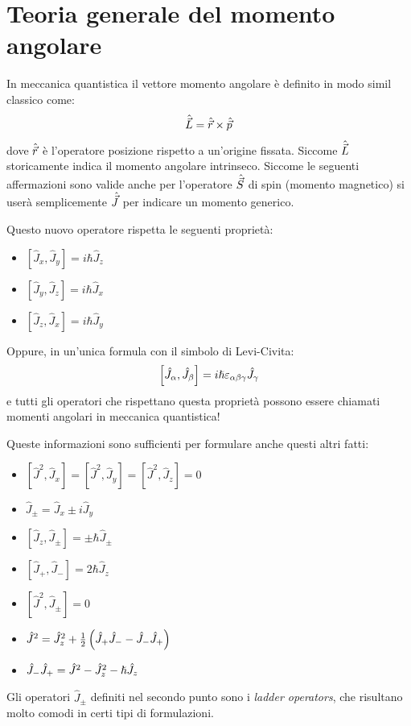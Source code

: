 \section{Teoria generale del momento angolare}
In meccanica quantistica il vettore momento angolare è definito in modo simil classico come:
\[
	\hat{\vec L} = \hat{\vec{r}} \times \hat{\vec{p}}
\]
dove $\hat{\vec{r}}$ è l'operatore posizione rispetto a un'origine fissata. Siccome $\hat{\vec{L}}$ storicamente indica il momento angolare intrinseco. Siccome le seguenti affermazioni sono valide anche per l'operatore $\hat{\vec{S}}$ di spin (momento magnetico) si userà semplicemente $\hat{\vec{J}}$ per indicare un momento generico.
\tab

Questo nuovo operatore rispetta le seguenti proprietà:
\begin{itemize}
	\item $[\hat{J}_x, \hat{J}_y] = i\hbar \hat{J}_z$
	\item $[\hat{J}_y, \hat{J}_z] = i\hbar \hat{J}_x$
	\item $[\hat{J}_z, \hat{J}_x] = i\hbar \hat{J}_y$
\end{itemize}
Oppure, in un'unica formula con il simbolo di Levi-Civita:
\[
	\left[\hat J_\alpha, \hat J_\beta\right] = i\hslash\varepsilon_{\alpha\beta\gamma}\hat J_\gamma
\]
e tutti gli operatori che rispettano questa proprietà possono essere chiamati momenti angolari in meccanica quantistica!

Queste informazioni sono sufficienti per formulare anche questi altri fatti:
\begin{itemize}
	\item $[\hat{J}^2, \hat{J}_x] = [\hat{J}^2, \hat{J}_y] = [\hat{J}^2, \hat{J}_z] = 0$
	\item $\hat{J}_{\pm} = \hat{J}_x \pm i\hat{J}_y$
	\item $[\hat{J}_z, \hat{J}_{\pm}] = \pm\hbar \hat{J}_{\pm}$
	\item $[\hat{J}_+, \hat{J}_-] = 2\hbar \hat{J}_z$
	\item $[\hat{J}^2, \hat{J}_{\pm}] = 0$
	\item $\hat J^2 = \hat J_z^2 + \frac{1}{2} \left( \hat J_+ \hat J_- - \hat J_-\hat J_+ \right)$
	\item $\hat J_-\hat J_+ = \hat J^2 - \hat J_z^2 - \hslash \hat J_z$
\end{itemize}
Gli operatori $\hat J_\pm$ definiti nel secondo punto sono i \textit{ladder operators}, che risultano molto comodi in certi tipi di formulazioni.


